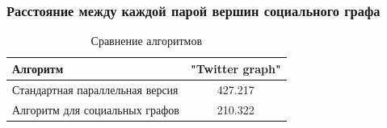 \documentclass[10pt, compress]{beamer}
\begin{document}
\begin{frame}[fragile]
  \frametitle{Расстояние между каждой парой вершин социального графа}

\begin{table}
\centering

\begin{tabular}{l|c}  
Алгоритм & "Twitter graph"\\
\hline\hline
Стандартная параллельная версия & 427.217 \\  
Алгоритм для социальных графов & 210.322  \\
\hline
\end{tabular}

\caption{Сравнение алгоритмов}
\label {table:algo_floyd_comparison}
\end{table}
  
\end{frame}


\end{document}
